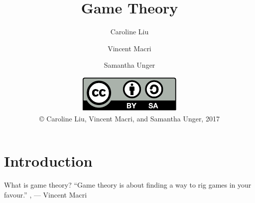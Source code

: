 

\usepackage{skull}
\usepackage{tikz}

\title{Game Theory}
\author{Caroline Liu \and Vincent Macri \and Samantha Unger}
\date{\includegraphics{../LicenseLogo}\\\copyright{} Caroline Liu, Vincent Macri, and Samantha Unger, 2017}

\newcommand{\emoji}[1]{\raisebox{-0.25\baselineskip}{\texttt{[image: \#1]}}}



	\frame{\titlepage}
	\section{Introduction}
	\begin{namedframe}{What is game theory?}
		``Game theory is about finding a way to rig games in your favour.''
		\sep
		\flushright
		--- Vincent Macri
	\end{namedframe}
	
	

